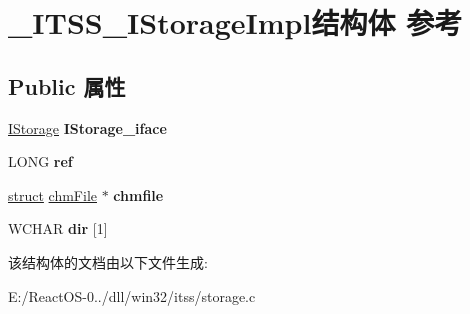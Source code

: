 \hypertarget{struct___i_t_s_s___i_storage_impl}{}\section{\+\_\+\+I\+T\+S\+S\+\_\+\+I\+Storage\+Impl结构体 参考}
\label{struct___i_t_s_s___i_storage_impl}
\subsection*{Public 属性}
\begin{DoxyCompactItemize}
\item 
\mbox{\label{struct___i_t_s_s___i_storage_impl_acc4d45cf38d278ee4b9306bef356f68e}} 
\hyperlink{interface_i_storage}{I\+Storage} {\bfseries I\+Storage\+\_\+iface}
\item 
\mbox{\label{struct___i_t_s_s___i_storage_impl_a5562565def06a0b64b01e22be8de822b}} 
L\+O\+NG {\bfseries ref}
\item 
\mbox{\label{struct___i_t_s_s___i_storage_impl_afddf29124abfb914d4acaf84ef66a10b}} 
\hyperlink{interfacestruct}{struct} \hyperlink{structchm_file}{chm\+File} $\ast$ {\bfseries chmfile}
\item 
\mbox{\label{struct___i_t_s_s___i_storage_impl_af88440c50ffe92e9309a60bed21fdff4}} 
W\+C\+H\+AR {\bfseries dir} \mbox{[}1\mbox{]}
\end{DoxyCompactItemize}


该结构体的文档由以下文件生成\+:\begin{DoxyCompactItemize}
\item 
E\+:/\+React\+O\+S-\/0../dll/win32/itss/storage.\+c\end{DoxyCompactItemize}
